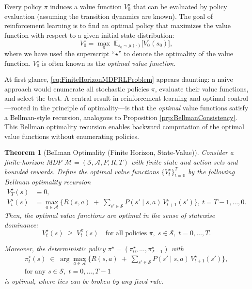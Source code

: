 \documentclass[
]{book}
\newtheorem{theorem}{Theorem}[chapter]
\theoremstyle{definition}
\theoremstyle{definition}
\theoremstyle{definition}
\theoremstyle{definition}
\theoremstyle{remark}
\begin{document}
Every policy \(\pi\) induces a value function \(V_0^{\pi}\) that can be evaluated by policy evaluation (assuming the transition dynamics are known). The goal of reinforcement learning is to find an optimal policy that maximizes the value function with respect to a given initial state distribution:
\begin{equation}
V^\star_0 = \max_{\pi}\; \mathbb{E}_{s_0 \sim \mu(\cdot)} \big[ V_0^{\pi}(s_0) \big],
\label{eq:FiniteHorizonMDPRLProblem}
\end{equation}
where we have used the superscript ``\(\star\)'' to denote the optimality of the value function. \(V^\star_0\) is often known as the \emph{optimal value function}.

At first glance, \eqref{eq:FiniteHorizonMDPRLProblem} appears daunting: a naive approach would enumerate all stochastic policies \(\pi\), evaluate their value functions, and select the best. A central result in reinforcement learning and optimal control---rooted in the principle of optimality---is that the \emph{optimal} value functions satisfy a Bellman-style recursion, analogous to Proposition \ref{prp:BellmanConsistency}. This Bellman optimality recursion enables backward computation of the optimal value functions without enumerating policies.

\begin{theorem}[Bellman Optimality (Finite Horizon, State-Value)]
\protect\hypertarget{thm:FiniteHorizonMDPBellmanOptimality}{}\label{thm:FiniteHorizonMDPBellmanOptimality}Consider a finite-horizon MDP \(\mathcal{M}=(\mathcal{S},\mathcal{A},P,R,T)\) with finite state and action sets and bounded rewards.
Define the optimal value functions \(\{V_t^\star\}_{t=0}^{T}\) by the following \emph{Bellman optimality} recursion
\begin{equation}
\begin{split}
V_T^\star(s)& \equiv 0, \\
V_t^\star(s)& = \max_{a\in\mathcal{A}}\Big\{ R(s,a)\;+\;\sum_{s'\in\mathcal{S}} P(s'\mid s,a)\,V_{t+1}^\star(s')\Big\},\ t=T-1,\ldots,0.
\end{split}
\label{eq:FiniteHorizonMDPBellmanOptimality}
\end{equation}
Then, the optimal value functions are optimal in the sense of \emph{statewise dominance}:
\begin{equation}
V_t^{\star}(s)\;\ge\; V_t^{\pi}(s)
\quad\text{for all policies }\pi,\; s\in\mathcal{S},\; t=0,\ldots,T.
\label{eq:FiniteHorizonMDPStatewiseDominance}
\end{equation}

Moreover, the deterministic policy
\(\pi^\star=(\pi^\star_0,\ldots,\pi^\star_{T-1})\) with
\begin{equation}
\begin{split}
\pi_t^\star(s)\;\in\;\arg\max_{a\in\mathcal{A}}
\Big\{ R(s,a)\;+\;\sum_{s'\in\mathcal{S}} P(s'\mid s,a)\,V_{t+1}^\star(s')\Big\}, \\
\text{for any } s\in\mathcal{S},\; t=0,\dots,T-1
\end{split}
\label{eq:FiniteHorizonMDPOptimalPolicy}
\end{equation}
is optimal, where ties can be broken by any fixed rule.
\end{theorem}
\end{document}
